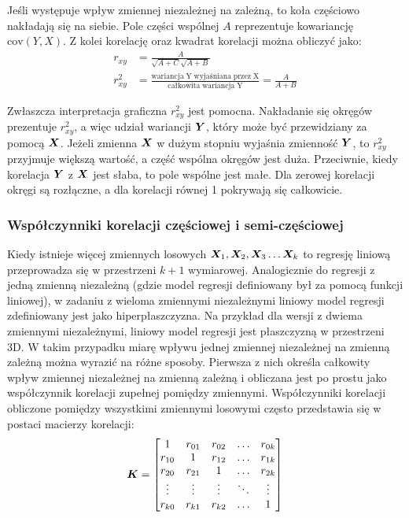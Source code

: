\begin{appendices}
Jeśli występuje wpływ zmiennej niezależnej na zależną, to koła częściowo nakładają się na siebie. Pole części wspólnej $A$ reprezentuje kowariancję $\mathrm{cov}(Y,X)$. Z kolei korelację oraz kwadrat korelacji można obliczyć jako:
\begin{equation}
	\begin{split}
	r_{xy} &= \frac{A}{\sqrt{A+C}\sqrt{A+B}} \\
	r_{xy}^2&= \frac{\mathrm{wariancja\;Y\;wyjaśniana\;przez\;X}}{\mathrm{całkowita\; wariancja\;Y}}=\frac{A}{A+B}
\end{split}
\end{equation}

Zwłaszcza interpretacja graficzna $r_{xy}^2$ jest pomocna. Nakładanie się okręgów prezentuje $r_{xy}^2$, a więc udział wariancji $\bm{Y}$, który może być przewidziany za pomocą $\bm{X}$. Jeżeli zmienna $\bm{X}$ w dużym stopniu wyjaśnia zmienność $\bm{Y}$, to $r_{xy}^2$ przyjmuje większą wartość, a część wspólna okręgów jest duża. Przeciwnie, kiedy korelacja $\bm{Y}$ z $\bm{X}$ jest słaba, to pole wspólne jest małe. Dla zerowej korelacji okręgi są rozłączne, a dla korelacji równej 1 pokrywają się całkowicie.




\subsubsection{Współczynniki korelacji częściowej i semi-częściowej}

Kiedy istnieje więcej zmiennych losowych $\vect{X}_1, \vect{X}_2, \vect{X}_3 \dots \vect{X}_k$ to regresję liniową przeprowadza się w przestrzeni $k+1$ wymiarowej. Analogicznie do regresji z jedną zmienną niezależną (gdzie model regresji definiowany był za pomocą funkcji liniowej), w zadaniu z wieloma zmiennymi niezależnymi liniowy model regresji zdefiniowany jest jako hiperpłaszczyzna. Na przykład dla wersji z dwiema zmiennymi niezależnymi, liniowy model regresji jest płaszczyzną w przestrzeni 3D. W takim przypadku miarę wpływu jednej zmiennej niezależnej na zmienną zależną można wyrazić na różne sposoby. Pierwsza z nich określa całkowity wpływ zmiennej niezależnej na zmienną zależną i obliczana jest po prostu jako współczynnik korelacji zupełnej pomiędzy zmiennymi. Współczynniki korelacji obliczone pomiędzy wszystkimi zmiennymi losowymi często przedstawia się w postaci macierzy korelacji:
\begin{equation}
	\bm{K}=\begin{bmatrix}
1      & r_{01} &  r_{02} & \dots & r_{0k} \\
r_{10} & 1 		&  r_{12} & \dots & r_{1k} \\
r_{20} & r_{21}	&  1 	  & \dots & r_{2k} \\
\vdots & \vdots &  \vdots & \ddots & \vdots \\
r_{k0} & r_{k1} & 	r_{k2} & \dots & 1
	\end{bmatrix}
\end{equation}


\end{appendices}
